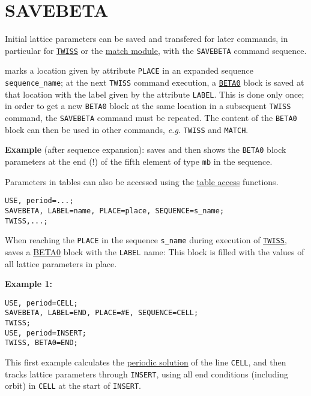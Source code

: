 \section{SAVEBETA}
\label{sec:savebeta}
Initial lattice parameters can be saved and transfered for later commands, in
particular for \hyperref[chap:twiss]{\texttt{TWISS}} or the
\hyperref[chap:match]{match module}, with the \texttt{SAVEBETA} command
sequence.   

marks a location given by attribute \texttt{PLACE} in an expanded
sequence \texttt{sequence\_name}; at the next \texttt{TWISS} command
execution, a \hyperref[sec:beta0]{\texttt{BETA0}} block is saved at that
location with the label given by the attribute \texttt{LABEL}. This is
done only once; in order to get a new \texttt{BETA0} block at the same
location in a subsequent \texttt{TWISS} command, the \texttt{SAVEBETA}
command  must be repeated. The content of the \texttt{BETA0} block can
then be used in other commands, \textsl{e.g.} \texttt{TWISS} and
\texttt{MATCH}. 

\textbf{Example} (after sequence expansion): 
saves and then shows the \texttt{BETA0} block parameters at the end (!) of the
fifth element of type \texttt{mb} in the sequence.  


Parameters in tables can also be accessed 
using the \hyperref[chap:tables]{table access} functions. 
\begin{verbatim}
USE, period=...;
SAVEBETA, LABEL=name, PLACE=place, SEQUENCE=s_name;
TWISS,...;
\end{verbatim}

When reaching the \texttt{PLACE} in the
sequence \texttt{s\_name} during execution of
\hyperref[chap:twiss]{\texttt{TWISS}}, \madx saves a
\hyperref[sec:beta0]{BETA0} block with the \texttt{LABEL} name: This
block is filled with the values of all lattice parameters in place.   

\textbf{Example 1:} 
\begin{verbatim}
USE, period=CELL;
SAVEBETA, LABEL=END, PLACE=#E, SEQUENCE=CELL;
TWISS;
USE, period=INSERT;
TWISS, BETA0=END;
\end{verbatim}
This first example calculates the \hyperref[sec:twissperiod]{periodic
  solution} of the line \texttt{CELL}, and then tracks lattice parameters through
\texttt{INSERT}, using all end conditions (including orbit) in
\texttt{CELL} at the start of \texttt{INSERT}.  

